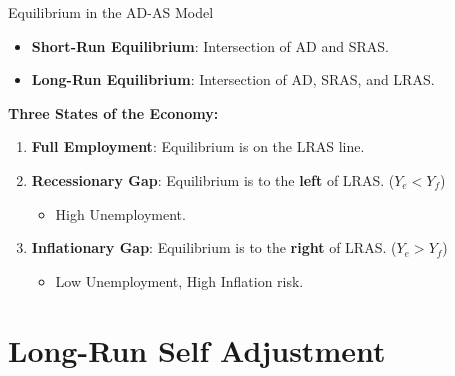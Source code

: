 \documentclass{beamer}
\begin{document}
\begin{frame}{Equilibrium in the AD-AS Model}
    \begin{itemize}
        \item \textbf{Short-Run Equilibrium}: Intersection of AD and SRAS. 
        \item \textbf{Long-Run Equilibrium}: Intersection of AD, SRAS, and LRAS.
    \end{itemize}
    \vspace{0.5cm}
    \textbf{Three States of the Economy:}
    \begin{enumerate}
        \item \textbf{Full Employment}: Equilibrium is on the LRAS line.
        \item \textbf{Recessionary Gap}: Equilibrium is to the \textbf{left} of LRAS. ($Y_e < Y_f$)
        \begin{itemize}
            \item High Unemployment.
        \end{itemize}
        \item \textbf{Inflationary Gap}: Equilibrium is to the \textbf{right} of LRAS. ($Y_e > Y_f$)
        \begin{itemize}
            \item Low Unemployment, High Inflation risk.
        \end{itemize}
    \end{enumerate}
\end{frame}

\section{Long-Run Self Adjustment}
\end{document}
